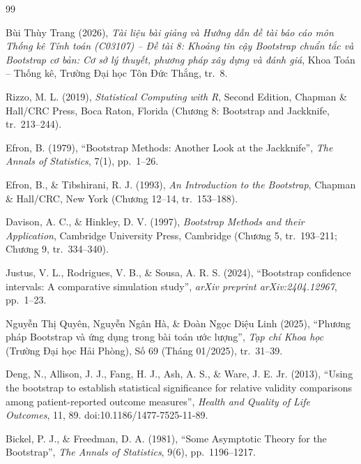 \documentclass[12pt,a4paper]{article}
\theoremstyle{definition}
\numberwithin{equation}{section}
\begin{document}
	\newpage
	\renewcommand{\refname}{Tài liệu tham khảo}
\begin{thebibliography}{99}
		\small
		\setlength{\itemsep}{1.5pt}
		\setlength{\parskip}{0pt}

		Bùi Thùy Trang (2026), \textit{Tài liệu bài giảng và Hướng dẫn đề tài báo cáo môn Thống kê Tính toán (C03107) -- Đề tài 8: Khoảng tin cậy Bootstrap chuẩn tắc và Bootstrap cơ bản: Cơ sở lý thuyết, phương pháp xây dựng và đánh giá}, Khoa Toán – Thống kê, Trường Đại học Tôn Đức Thắng, tr.~8.

		Rizzo, M. L. (2019), \textit{Statistical Computing with R}, Second Edition, Chapman \& Hall/CRC Press, Boca Raton, Florida (Chương 8: Bootstrap and Jackknife, tr.~213--244).

		Efron, B. (1979), ``Bootstrap Methods: Another Look at the Jackknife'', \textit{The Annals of Statistics}, 7(1), pp.~1--26.

		Efron, B., \& Tibshirani, R. J. (1993), \textit{An Introduction to the Bootstrap}, Chapman \& Hall/CRC, New York (Chương 12--14, tr.~153--188).

		Davison, A. C., \& Hinkley, D. V. (1997), \textit{Bootstrap Methods and their Application}, Cambridge University Press, Cambridge (Chương 5, tr.~193--211; Chương 9, tr.~334--340).

		Justus, V. L., Rodrigues, V. B., \& Sousa, A. R. S. (2024), ``Bootstrap confidence intervals: A comparative simulation study'', \textit{arXiv preprint arXiv:2404.12967}, pp.~1--23.

		Nguyễn Thị Quyên, Nguyễn Ngân Hà, \& Đoàn Ngọc Diệu Linh (2025), ``Phương pháp Bootstrap và ứng dụng trong bài toán ước lượng'', \textit{Tạp chí Khoa học} (Trường Đại học Hải Phòng), Số 69 (Tháng 01/2025), tr.~31--39.

		Deng, N., Allison, J. J., Fang, H. J., Ash, A. S., \& Ware, J. E. Jr. (2013), ``Using the bootstrap to establish statistical significance for relative validity comparisons among patient-reported outcome measures'', \textit{Health and Quality of Life Outcomes}, 11, 89. doi:10.1186/1477-7525-11-89.

		Bickel, P. J., \& Freedman, D. A. (1981), ``Some Asymptotic Theory for the Bootstrap'', \textit{The Annals of Statistics}, 9(6), pp.~1196--1217.


\end{thebibliography}
\end{document}
